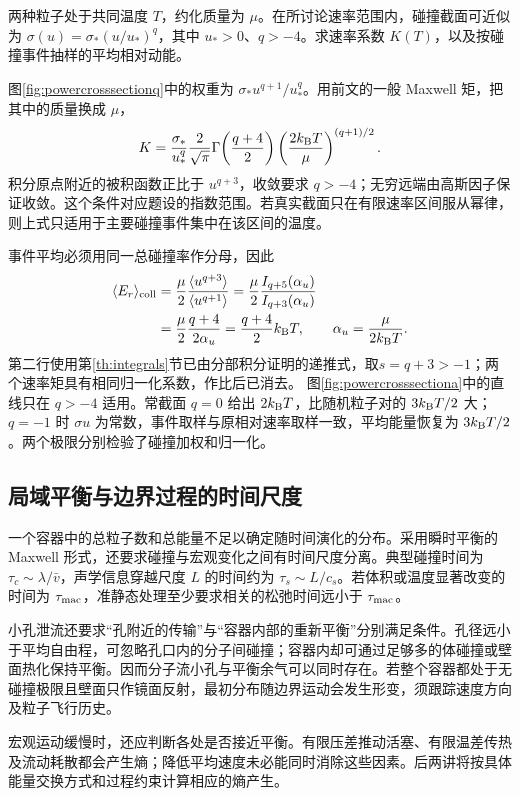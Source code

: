\begin{example}[速率相关截面的碰撞平均]
\label{ex:powercrosssection}
两种粒子处于共同温度 $T$，约化质量为 $\mu$。在所讨论速率范围内，碰撞截面可近似为 $\sigma(u)=\sigma_\ast(u/u_\ast)^q$，其中 $u_\ast>0$、$q>-4$。求速率系数 $K(T)$，以及按碰撞事件抽样的平均相对动能。
\end{example}
\begin{solution}
图\ref{fig:powercrosssectionq}中的权重为
$\sigma_\ast u^{q+1}/u_\ast^q$。用前文的一般 Maxwell 矩，把其中的质量换成 $\mu$，
\[
 K=\frac{\sigma_\ast}{u_\ast^q}
 \frac2{\sqrt\pi}\Gamma\!\left(\frac{q+4}{2}\right)
 \left(\frac{2k_{\mathrm B} T}{\mu}\right)^{(q+1)/2}.
\]
积分原点附近的被积函数正比于 $u^{q+3}$，收敛要求 $q>-4$；无穷远端由高斯因子保证收敛。这个条件对应题设的指数范围。若真实截面只在有限速率区间服从幂律，则上式只适用于主要碰撞事件集中在该区间的温度。

事件平均必须用同一总碰撞率作分母，因此
\[
\begin{aligned}
 \langle E_r\rangle_{\rm coll}
 &=\frac{\mu}{2}\frac{\langle u^{q+3}\rangle}
 {\langle u^{q+1}\rangle}
 =\frac{\mu}{2}\frac{I_{q+5}(\alpha_u)}{I_{q+3}(\alpha_u)}\\
 &=\frac{\mu}{2}\frac{q+4}{2\alpha_u}
 =\frac{q+4}{2}k_{\mathrm B} T,\qquad \alpha_u=\frac\mu{2k_{\mathrm B} T}.
\end{aligned}
\]
第二行使用第\ref{th:integrals}节已由分部积分证明的递推式，取$s=q+3>-1$；两个速率矩具有相同归一化系数，作比后已消去。
图\ref{fig:powercrosssectiona}中的直线只在 $q>-4$ 适用。常截面 $q=0$ 给出 $2k_{\mathrm B} T$，比随机粒子对的 $3k_{\mathrm B} T/2$ 大；$q=-1$ 时 $\sigma u$ 为常数，事件取样与原相对速率取样一致，平均能量恢复为 $3k_{\mathrm B} T/2$。两个极限分别检验了碰撞加权和归一化。
\end{solution}

\subsection{局域平衡与边界过程的时间尺度}
一个容器中的总粒子数和总能量不足以确定随时间演化的分布。采用瞬时平衡的 Maxwell 形式，还要求碰撞与宏观变化之间有时间尺度分离。典型碰撞时间为 $\tau_c\sim\lambda/\bar v$，声学信息穿越尺度 $L$ 的时间约为 $\tau_s\sim L/c_s$。若体积或温度显著改变的时间为 $\tau_{\rm mac}$，准静态处理至少要求相关的松弛时间远小于 $\tau_{\rm mac}$。

小孔泄流还要求“孔附近的传输”与“容器内部的重新平衡”分别满足条件。孔径远小于平均自由程，可忽略孔口内的分子间碰撞；容器内却可通过足够多的体碰撞或壁面热化保持平衡。因而分子流小孔与平衡余气可以同时存在。若整个容器都处于无碰撞极限且壁面只作镜面反射，最初分布随边界运动会发生形变，须跟踪速度方向及粒子飞行历史。

宏观运动缓慢时，还应判断各处是否接近平衡。有限压差推动活塞、有限温差传热及流动耗散都会产生熵；降低平均速度未必能同时消除这些因素。后两讲将按具体能量交换方式和过程约束计算相应的熵产生。

